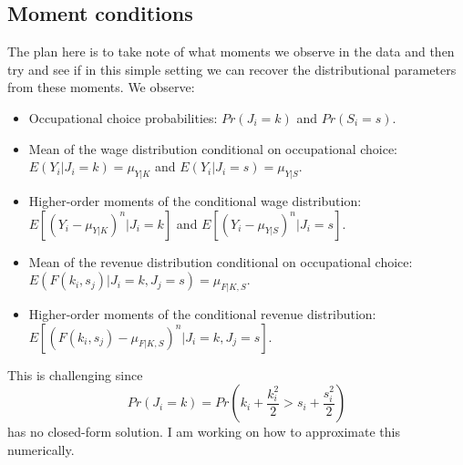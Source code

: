 \documentclass{article}
\begin{document}
\subsection*{Moment conditions}
The plan here is to take note of what moments we observe in the data and then try and see if in this simple setting we can recover the distributional parameters from these moments. We observe:
\begin{itemize}
	\item Occupational choice probabilities: $Pr(J_i = k)$ and $Pr(S_i = s)$.
	\item Mean of the wage distribution conditional on occupational choice: $E(Y_i | J_i = k) = \mu_{Y|K}$ and $E(Y_i | J_i = s) = \mu_{Y|S}$.
	\item Higher-order moments of the conditional wage distribution: $E[(Y_i - \mu_{Y|K})^n| J_i = k]$ and $E[(Y_i - \mu_{Y|S})^n| J_i = s]$.
	\item Mean of the revenue distribution conditional on occupational choice: $E(F(k_i,s_j)|J_i = k,J_j = s) = \mu_{F|K,S}$.
	\item Higher-order moments of the conditional revenue distribution: $E[(F(k_i,s_j)-\mu_{F|K,S})^n|J_i = k,J_j = s]$.
\end{itemize}
This is challenging since 
\begin{equation*}
	Pr(J_i = k) = Pr\left(k_i + \frac{k_i^2}{2} > s_i + \frac{s_i^2}{2}\right)
\end{equation*}
has no closed-form solution. I am working on how to approximate this numerically.

%
%
\end{document}
